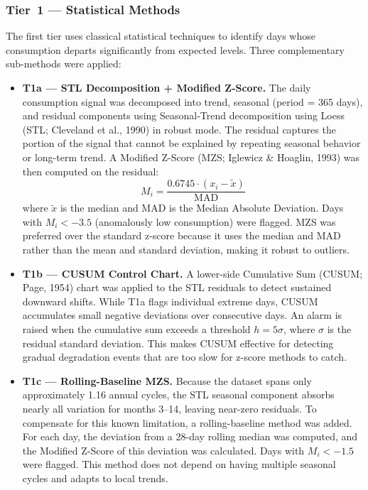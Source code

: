 \documentclass{article}
\begin{document}
\subsubsection{Tier~1 --- Statistical Methods}

The first tier uses classical statistical techniques to identify days whose consumption departs significantly from expected levels. Three complementary sub-methods were applied:

\begin{itemize}
    \item \textbf{T1a --- STL Decomposition + Modified Z-Score.} The daily consumption signal was decomposed into trend, seasonal (period = 365 days), and residual components using Seasonal-Trend decomposition using Loess (STL; Cleveland et al., 1990) in robust mode. The residual captures the portion of the signal that cannot be explained by repeating seasonal behavior or long-term trend. A Modified Z-Score (MZS; Iglewicz \& Hoaglin, 1993) was then computed on the residual:
    \[
    M_i = \frac{0.6745 \cdot (x_i - \tilde{x})}{\text{MAD}}
    \]
    where $\tilde{x}$ is the median and MAD is the Median Absolute Deviation. Days with $M_i < -3.5$ (anomalously low consumption) were flagged. MZS was preferred over the standard z-score because it uses the median and MAD rather than the mean and standard deviation, making it robust to outliers.

    \item \textbf{T1b --- CUSUM Control Chart.} A lower-side Cumulative Sum (CUSUM; Page, 1954) chart was applied to the STL residuals to detect sustained downward shifts. While T1a flags individual extreme days, CUSUM accumulates small negative deviations over consecutive days. An alarm is raised when the cumulative sum exceeds a threshold $h = 5\sigma$, where $\sigma$ is the residual standard deviation. This makes CUSUM effective for detecting gradual degradation events that are too slow for z-score methods to catch.

    \item \textbf{T1c --- Rolling-Baseline MZS.} Because the dataset spans only approximately 1.16 annual cycles, the STL seasonal component absorbs nearly all variation for months 3--14, leaving near-zero residuals. To compensate for this known limitation, a rolling-baseline method was added. For each day, the deviation from a 28-day rolling median was computed, and the Modified Z-Score of this deviation was calculated. Days with $M_i < -1.5$ were flagged. This method does not depend on having multiple seasonal cycles and adapts to local trends.
\end{itemize}
\end{document}
